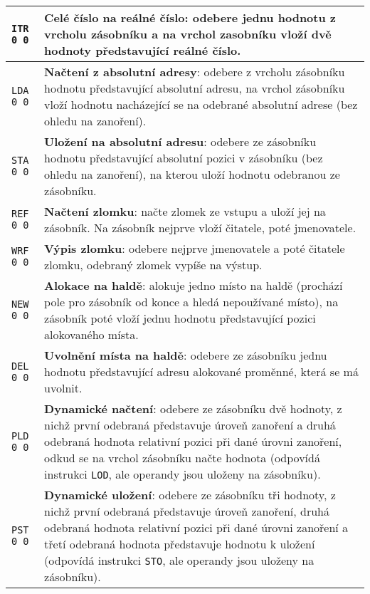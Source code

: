 \documentclass{article}
\begin{document}
\begin{longtable}{|l| p{10cm}|}
		\rule{0pt}{3ex} \texttt{ITR 0 0} & \textbf{Celé číslo na reálné číslo}: odebere jednu hodnotu z vrcholu zásobníku a na vrchol zasobníku vloží dvě hodnoty představující reálné číslo. \\ \hline
		
		\rule{0pt}{3ex} \texttt{LDA 0 0} & \textbf{Načtení z absolutní adresy}: odebere z vrcholu zásobníku hodnotu představující absolutní adresu, na vrchol zásobníku vloží hodnotu nacházející se na odebrané absolutní adrese (bez ohledu na zanoření). \\ \hline
		
		\rule{0pt}{3ex} \texttt{STA 0 0} & \textbf{Uložení na absolutní adresu}: odebere ze zásobníku hodnotu představující absolutní pozici v zásobníku (bez ohledu na zanoření), na kterou uloží hodnotu odebranou ze zásobníku. \\ \hline
		
		\rule{0pt}{3ex} \texttt{REF 0 0} & \textbf{Načtení zlomku}: načte zlomek ze vstupu a uloží jej na zásobník. Na zásobník nejprve vloží čitatele, poté jmenovatele. \\ \hline
		
		\rule{0pt}{3ex} \texttt{WRF 0 0} & \textbf{Výpis zlomku}: odebere nejprve jmenovatele a poté čitatele zlomku, odebraný zlomek vypíše na výstup. \\ \hline
		
		\rule{0pt}{3ex} \texttt{NEW 0 0} & \textbf{Alokace na haldě}: alokuje jedno místo na haldě (prochází pole pro zásobník od konce a hledá nepoužívané místo), na zásobník poté vloží jednu hodnotu představující pozici alokovaného místa. \\ \hline
		
		\rule{0pt}{3ex} \texttt{DEL 0 0} & \textbf{Uvolnění místa na haldě}: odebere ze zásobníku jednu hodnotu představující adresu alokované proměnné, která se má uvolnit.\\ \hline
		
		\rule{0pt}{3ex} \texttt{PLD 0 0} & \textbf{Dynamické načtení}: odebere ze zásobníku dvě hodnoty, z nichž první odebraná představuje úroveň zanoření a druhá odebraná hodnota relativní pozici při dané úrovni zanoření, odkud se na vrchol zásobníku načte hodnota (odpovídá instrukci \texttt{LOD}, ale operandy jsou uloženy na zásobníku).\\ \hline
		
		\rule{0pt}{3ex} \texttt{PST 0 0} & \textbf{Dynamické uložení}: odebere ze zásobníku tři hodnoty, z nichž první odebraná představuje úroveň zanoření, druhá odebraná hodnota relativní pozici při dané úrovni zanoření a třetí odebraná hodnota představuje hodnotu k uložení (odpovídá instrukci \texttt{STO}, ale operandy jsou uloženy na zásobníku).\\ \hline
	\end{longtable}
\end{document}
